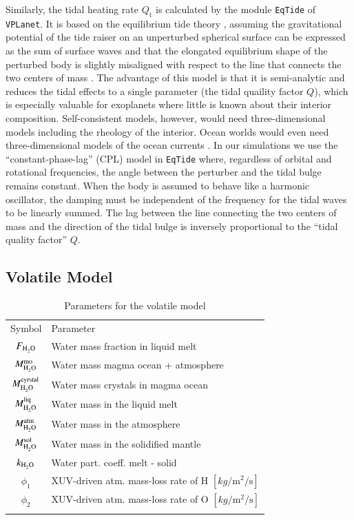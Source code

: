 \documentclass[oneside,twocolumn]{article}
\newcommand{\vplanet}{\texttt{\footnotesize{VPLanet}}}
\newcommand{\eqtide}{\texttt{\footnotesize{EqTide}}}
\begin{document}
Similarly, the tidal heating rate $Q_\mathrm{t}$ is calculated by the module \eqtide{} of \vplanet{}.
It is based on the equilibrium tide theory \citep{Darwin1880,Ferraz-Mello2008,Leconte2010}, assuming the gravitational potential of the tide raiser on an unperturbed spherical surface can be expressed as the sum of surface waves and that the elongated equilibrium shape of the perturbed body is slightly misaligned with respect to the line that connects the two centers of mass \citep{Barnes2020}.
The advantage of this model is that it is semi-analytic and reduces the tidal effects to a single parameter (the tidal quaility factor $Q$), which is especially valuable for exoplanets where little is known about their interior composition.
Self-consistent models, however, would need three-dimensional models including the rheology of the interior.
Ocean worlds would even need three-dimensional models of the ocean currents \citep{Carone2012}.
In our simulations we use the ``constant-phase-lag'' (CPL) model in \eqtide{} where, regardless of orbital and rotational frequencies, the angle between the perturber and the tidal bulge remains constant.
When the body is assumed to behave like a harmonic oscillator, the damping must be independent of the frequency for the tidal waves to be linearly summed.
The lag between the line connecting the two centers of mass and the direction of the tidal bulge is inversely proportional to the ``tidal quality factor'' $Q$.

\subsection{Volatile Model}
\label{sec_vol_model}

\begin{table}[ht]
	\caption[Parameters volatile model]{Parameters for the volatile model}
	\begin{tabular}{cl}
		\noalign{\smallskip}
		\hline
		\noalign{\smallskip}
		Symbol & Parameter \\ 
		\noalign{\smallskip}
		\hline \hline
		\noalign{\smallskip}
		$F_{\ce{H2O}}$ & Water mass fraction in liquid melt \\ 
		$M_{\ce{H2O}}^{\mathrm{mo}} $ & Water mass magma ocean + atmosphere \\
		$M_{\ce{H2O}}^{\mathrm{cyrstal}} $ & Water mass crystals in magma ocean \\
		$M_{\ce{H2O}}^{\mathrm{liq}} $ & Water mass in the liquid melt \\
		$M_{\ce{H2O}}^{\mathrm{atm}} $ & Water mass in the atmosphere \\
		$M_{\ce{H2O}}^{\mathrm{sol}} $ & Water mass in the solidified mantle \\
		$k_{\ce{H2O}}$ & Water part. coeff. melt - solid \\
		$\phi_1$ & XUV-driven atm. mass-loss rate of H $[\si{kg\per\metre\squared\per\second}]$\\
		$\phi_2$ & XUV-driven atm. mass-loss rate of O $[\si{kg\per\metre\squared\per\second}]$\\
		\noalign{\smallskip}
		\hline
	\end{tabular}
	\label{Tab_Volat_Model}
\end{table}
\end{document}
